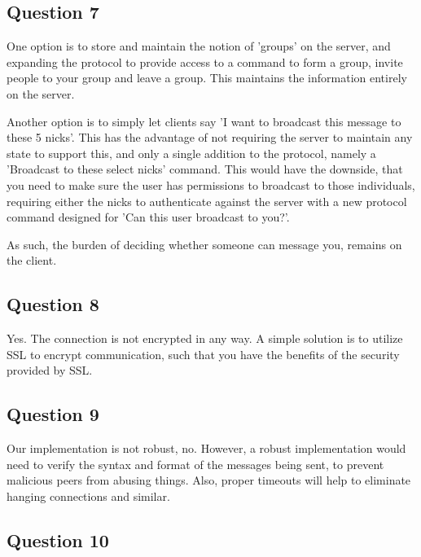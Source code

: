 \subsection{Question 7}
One option is to store and maintain the notion of 'groups' on the server, and expanding the protocol to provide access to
a command to form a group, invite people to your group and leave a group. This maintains the information entirely on the server.

Another option is to simply let clients say 'I want to broadcast this message to these 5 nicks'. This has the advantage of not
requiring the server to maintain any state to support this, and only a single addition to the protocol, namely a 'Broadcast to these
select nicks' command. This would have the downside, that you need to make sure the user has permissions to broadcast to those individuals,
requiring either the nicks to authenticate against the server with a new protocol command designed for 'Can this user broadcast to you?'.

As such, the burden of deciding whether someone can message you, remains on the client.

\subsection{Question 8}
Yes. The connection is not encrypted in any way. A simple solution is to utilize SSL to encrypt communication, such that you have the
benefits of the security provided by SSL. 

\subsection{Question 9}
Our implementation is not robust, no. However, a robust implementation would need to verify the syntax and format of the messages being
sent, to prevent malicious peers from abusing things. Also, proper timeouts will help to eliminate hanging connections and similar.

\subsection{Question 10}

